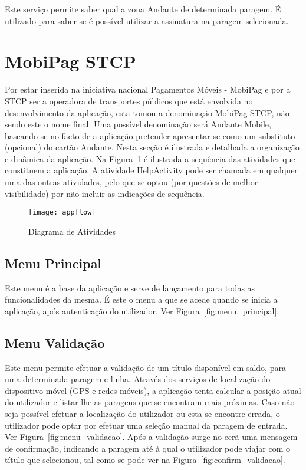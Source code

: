Este serviço permite saber qual a zona Andante de determinada paragem. É utilizado para saber se é possível utilizar a assinatura na paragem selecionada.

\section{MobiPag STCP}

Por estar inserida na iniciativa nacional Pagamentos Móveis - MobiPag \cite{cedt} e por a STCP ser a operadora de transportes públicos que está envolvida no desenvolvimento da aplicação, esta tomou a denominação MobiPag STCP, não sendo este o nome final. Uma possível denominação será Andante Mobile, baseando-se no facto de a aplicação pretender apresentar-se como um substituto (opcional) do cartão Andante.
Nesta secção é ilustrada e detalhada a organização e dinâmica da aplicação. Na Figura~\ref{fig:appflow} é ilustrada a sequência das atividades que constituem a aplicação. A atividade HelpActivity pode ser chamada em qualquer uma das outras atividades, pelo que se optou (por questões de melhor visibilidade) por não incluir as indicações de sequência.

\begin{figure}[t]
  \begin{center}
    \leavevmode
    \texttt{[image: appflow]}
    \caption{Diagrama de Atividades}
    \label{fig:appflow}
  \end{center}
\end{figure}

\subsection{Menu Principal}

Este menu é a base da aplicação e serve de lançamento para todas as funcionalidades da mesma. É este o menu a que se acede quando se inicia a aplicação, após autenticação do utilizador. Ver Figura~\ref{fig:menu_principal}.

\subsection{Menu Validação}

Este menu permite efetuar a validação de um título disponível em saldo, para uma determinada paragem e linha. Através dos serviços de localização do dispositivo móvel (GPS e redes móveis), a aplicação tenta calcular a posição atual do utilizador e listar-lhe as paragens que se encontram mais próximas. Caso não seja possível efetuar a localização do utilizador ou esta se encontre errada, o utilizador pode optar por efetuar uma seleção manual da paragem de entrada. Ver Figura~\ref{fig:menu_validacao}. Após a validação surge no ecrã uma mensagem de confirmação, indicando a paragem até à qual o utilizador pode viajar com o título que selecionou, tal como se pode ver na Figura~\ref{fig:confirm_validacao}.

